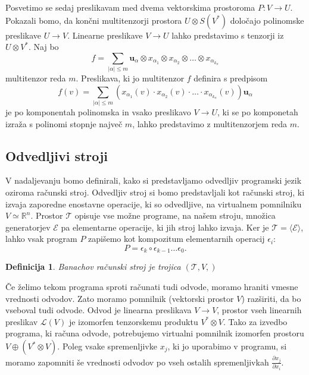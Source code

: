 \documentclass{article}
\newcommand{\RR}{\mathbb{R}}
\newcommand{\E}{\mathcal{E}}
\newcommand{\T}{\mathcal{T}}
\newcommand{\uu}{\mathbf{u}}
\newtheorem{definicija}{Definicija}[section]
\begin{document}
Posvetimo se sedaj preslikavam med dvema vektorskima prostoroma $P:V\to U$.
Pokazali bomo, da končni multitenzorji prostora $U\otimes S(V^*)$ določajo
polinomske preslikave $U\to V$. Linearne preslikave $V\to U$ lahko predstavimo s
tenzorji iz $U\otimes V^*$. Naj bo 
$$f=\sum_{|\alpha|\le m}\uu_\alpha\otimes x_{\alpha_1}\otimes x_{\alpha_2}\otimes
\ldots \otimes x_{\alpha_{k_\alpha}}$$ multitenzor reda $m$. Preslikava, ki jo
multitenzor $f$ definira s predpisom 
$$f(v) = \sum_{|\alpha|\le m}\left( x_{\alpha_1}(v)\cdot x_{\alpha_2}(v)\cdot
\ldots \cdot x_{\alpha_{k_\alpha}}(v) \right)\uu_\alpha$$
je po komponentah polinomska in vsako preslikavo $V\to U$, ki se po komponetah izraža s
polinomi stopnje največ $m$, lahko predstavimo z multitenzorjem reda $m$.

\subsection{Odvedljivi stroji}
V nadaljevanju bomo definirali, kako si predstavljamo odvedljiv programski jezik
oziroma računski stroj. Odvedljiv stroj si bomo predstavljali kot računski
stroj, ki izvaja zaporedne enostavne operacije, ki so odvedljive, na virtualnem
pomnilniku $V\simeq\RR^n$. Prostor $\T$ opisuje vse možne programe, na našem
stroju, množica generatorjev $\E$ pa elementarne operacije, ki jih stroj lahko
izvaja. Ker je $\T=\langle \E \rangle$, lahko vsak program $P$ zapišemo kot
kompozitum elementarnih operacij $\epsilon_i$:
\[
P = \epsilon_k\circ\epsilon_{k-1}\ldots\epsilon_0.
\]  
\begin{definicija}
 Banachov računski stroj je trojica $(\T,V,)$  
\end{definicija}
Če želimo tekom programa sproti računati tudi odvode, moramo hraniti vmesne
vrednosti odvodov. Zato moramo pomnilnik (vektorski prostor $V$) razširiti, da
bo vseboval tudi odvode. Odvod je linearna preslikava $V\to V$, prostor
vseh linearnih preslikav $\mathcal{L}(V)$ je izomorfen tenzorskemu produktu
$V^*\otimes V$. Tako za izvedbo programa, ki računa odvode, potrebujemo virtualni
pomnilnik izomorfen prostoru $V\oplus (V^*\otimes V)$. Poleg vsake spremenljivke $x_j$, ki
jo uporabimo v programu, si moramo zapomniti še vrednosti odvodov po vseh
ostalih spremenljivkah $\frac{\partial x_j}{\partial x_i}$.   
\end{document}
